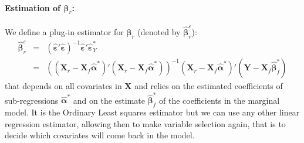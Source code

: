 \documentclass[12pt,a4paper]{report}
\begin{document}
	\paragraph{Estimation of $\boldsymbol{\beta}_r$:} We define a plug-in estimator for $\boldsymbol{\beta}_r$ (denoted by $\hat{\boldsymbol{\beta}}_r^{\varepsilon}$):
	\begin{eqnarray}
		\hat{\boldsymbol{\beta}}_r^{\varepsilon}&=&(\hat{\boldsymbol{\varepsilon}}'\hat{\boldsymbol{\varepsilon}})^{-1}\hat{\boldsymbol{\varepsilon}}'\hat{\boldsymbol{\varepsilon}}_Y^*  \nonumber \\
	&=&\left((\boldsymbol{X}_r-\boldsymbol{X}_f\hat{\boldsymbol{\alpha}}^*)'(\boldsymbol{X}_r-\boldsymbol{X}_f\hat{\boldsymbol{\alpha}}^*)\right)^{-1}(\boldsymbol{X}_r-\boldsymbol{X}_f\hat{\boldsymbol{\alpha}}^*)'(\boldsymbol{Y}- \boldsymbol{X}_f\hat{\boldsymbol{\beta}}^*_f)	\label{estimpluginlong}
	\end{eqnarray}
that depends on all covariates in $\boldsymbol{X}$ and relies on the estimated coefficients of sub-regressions $\hat{\boldsymbol{\alpha}}^*$ and on the estimate $\hat{\boldsymbol{\beta}}_f^*$ of the coefficients in the marginal model. It is the Ordinary Least squares estimator but we can use any other linear regression estimator, allowing then to make variable selection again, that is to decide which covariates will come back in the model. 
\end{document}
